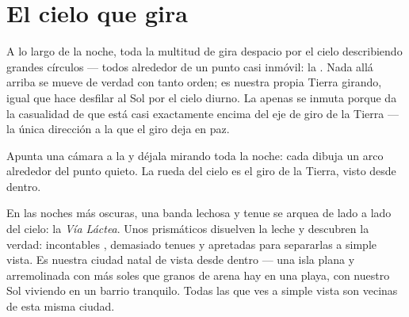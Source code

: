 \section{El cielo que gira}

\begin{proposition}\label{prop:g5:stars-night-sky:wheel}
A lo largo de la noche, toda la multitud de  gira despacio
por el cielo describiendo grandes círculos --- todos alrededor de un
punto casi inmóvil: la . Nada allá arriba se mueve de
verdad con tanto orden; es nuestra propia Tierra girando, igual que
hace desfilar al Sol por el cielo diurno. La  apenas
se inmuta porque da la casualidad de que está casi exactamente encima
del eje de giro de la Tierra --- la única dirección a la que el giro
deja en paz.
\end{proposition}

\begin{omfigure}

{\small Apunta una cámara a la  y déjala mirando toda
la noche: cada  dibuja un arco alrededor del punto quieto.
La rueda del cielo es el giro de la Tierra, visto desde dentro.}
\end{omfigure}

\begin{example}\label{ex:g5:stars-night-sky:milkyway}
En las noches más oscuras, una banda lechosa y tenue se arquea de
lado a lado del cielo: la \emph{Vía Láctea}. Unos
prismáticos disuelven la leche y descubren la verdad: incontables
, demasiado tenues y apretadas para separarlas a simple
vista. Es nuestra ciudad natal de  vista desde dentro ---
una isla plana y arremolinada con más soles que granos de arena hay en
una playa, con nuestro Sol viviendo en un barrio tranquilo. Todas las
 que ves a simple vista son vecinas de esta misma ciudad.
\end{example}

